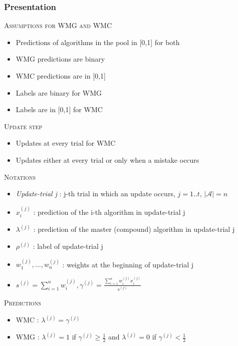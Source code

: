 \documentclass{beamer}
\begin{document}
			\subsubsection*{Presentation}
\begin{frame}

\textsc{Assumptions for WMG and WMC} 
\begin{itemize}
\item Predictions of algorithms in the pool in [0,1] for both
\item WMG predictions are binary
\item WMC predictions are in [0,1]
\item Labels are binary for WMG
\item Labels are in [0,1] for WMC \newline
\end{itemize}

\textsc{Update step} 
\begin{itemize}
\item Updates at every trial for WMC
\item Updates either at every trial or only when a mistake occurs
\end{itemize}

\end{frame}	

\begin{frame}

\textsc{Notations}
\begin{itemize}
\item \textit{Update-trial j} : j-th trial  in which an update occurs, $j = 1..t$, $\lvert\mathcal{A}\rvert = n$
\item $x_i^{(j)}$ : prediction of the i-th algorithm in update-trial j
\item $\lambda^{(j)}$ : prediction of the master (compound) algorithm in update-trial j
\item $\rho^{(j)}$ : label of update-trial j
\item $w_1^{(j)}, ..., w_n^{(j)}$ : weights at the beginning of update-trial j
\item $s^{(j)} = \sum_{i=1}^{n}w_i^{(j)}, \gamma^{(j)} = \frac{\sum_{i=1}^{n}w_i^{(j)}x_i^{(j)}}{s^{(j)}}$\newline
\end{itemize}
\textsc{Predictions}
\begin{itemize}
\item WMC : $\lambda^{(j)} = \gamma^{(j)}$
\item WMG : $\lambda^{(j)} = 1$ if $\gamma^{(j)} \geq \frac{1}{2}$ and $\lambda^{(j)} = 0$ if $\gamma^{(j)} < \frac{1}{2}$
\end{itemize}

\end{frame}		
\end{document}
